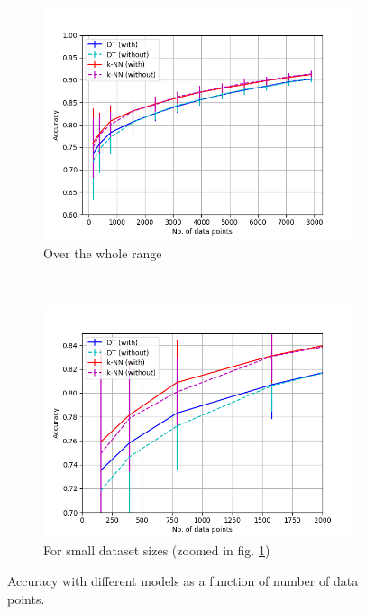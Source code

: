 \documentclass{article}
\begin{document}
\begin{figure}[h!]
    \centering
    \begin{subfigure}[b]{0.475\textwidth}
        \includegraphics[width=\textwidth]{../figures/accuracy_vs_size.png}
        \caption{Over the whole range}
        \label{fig:acc_vs_size_a}
    \end{subfigure}
    ~ %
    \begin{subfigure}[b]{0.475\textwidth}
        \includegraphics[width=\textwidth]{../figures/accuracy_vs_size2.png}
        \caption{For small dataset sizes (zoomed in fig. \ref{fig:acc_vs_size_a})}
        \label{fig:acc_vs_size_b}
    \end{subfigure}
    \caption{Accuracy with different models as a function of number of data points.}\label{fig:acc_vs_size}
\end{figure}
\end{document}
